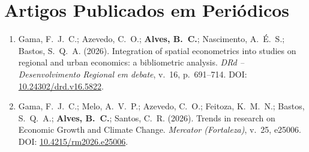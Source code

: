 \documentclass[10pt,a4paper]{article}
\begin{document}
\section{Artigos Publicados em Periódicos}
\begin{enumerate}\small
  \item Gama, F.\ J.\ C.; Azevedo, C.\ O.; \textbf{Alves, B.\ C.}; Nascimento, A.\ É.\ S.; Bastos, S.\ Q.\ A. (2026). Integration of spatial econometrics into studies on regional and urban economics: a bibliometric analysis. \textit{DRd -- Desenvolvimento Regional em debate}, v.\ 16, p.\ 691--714. DOI: \href{https://doi.org/10.24302/drd.v16.5822}{10.24302/drd.v16.5822}.
  \item Gama, F.\ J.\ C.; Melo, A.\ V.\ P.; Azevedo, C.\ O.; Feitoza, K.\ M.\ N.; Bastos, S.\ Q.\ A.; \textbf{Alves, B.\ C.}; Santos, C.\ R. (2026). Trends in research on Economic Growth and Climate Change. \textit{Mercator (Fortaleza)}, v.\ 25, e25006. DOI: \href{https://doi.org/10.4215/rm2026.e25006}{10.4215/rm2026.e25006}.
\end{enumerate}

\end{document}
